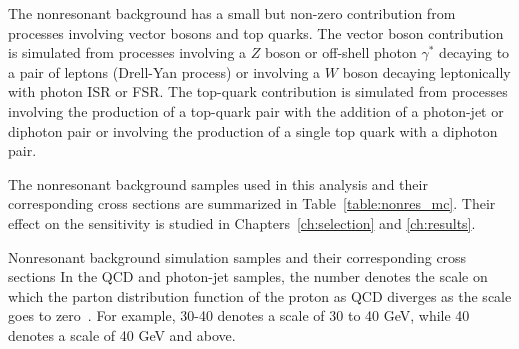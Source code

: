 The nonresonant background has a small but non-zero contribution from processes involving
vector bosons and top quarks. The vector boson contribution is simulated from processes
involving a $Z$ boson or off-shell photon $\gamma^*$ decaying to a pair of leptons (Drell-Yan process)
or involving a $W$ boson decaying leptonically with photon ISR or FSR. The top-quark contribution is
simulated from processes involving the production of a top-quark pair with the addition of a
photon-jet or diphoton pair or involving the production of a single top quark with a diphoton pair.

The nonresonant background samples used in this analysis and their corresponding 
cross sections are summarized in Table~\ref{table:nonres_mc}.
Their effect on the sensitivity is studied in Chapters~\ref{ch:selection} and \ref{ch:results}.

\begin{table}[ht]
  \centering
  \renewcommand{\arraystretch}{1.4}
  \caption{Nonresonant background simulation samples and their corresponding cross sections
In the QCD and photon-jet samples, the number denotes the scale on which the parton
distribution function of the proton as QCD diverges as the scale goes to zero~\cite{Martin:2009iq}.
For example, 30-40 denotes a scale of 30 to 40 GeV, while 40 denotes a scale of 40 GeV and above.}
  
  \label{table:nonres_mc}
\end{table}
